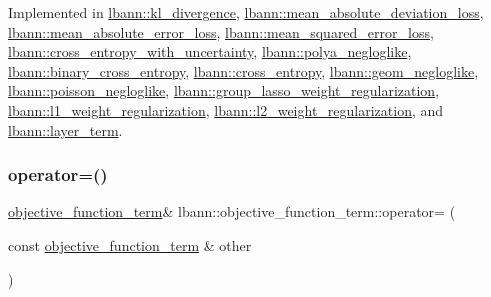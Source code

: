 Implemented in \hyperlink{classlbann_1_1kl__divergence_a42f016a75f640cb4ec9ceb9320da4a47}{lbann\+::kl\+\_\+divergence}, \hyperlink{classlbann_1_1mean__absolute__deviation__loss_a05e9ac150bf3875ebb0a81e07ac3dfa0}{lbann\+::mean\+\_\+absolute\+\_\+deviation\+\_\+loss}, \hyperlink{classlbann_1_1mean__absolute__error__loss_ae44350a67a0be0357291827f194d9f77}{lbann\+::mean\+\_\+absolute\+\_\+error\+\_\+loss}, \hyperlink{classlbann_1_1mean__squared__error__loss_ab34d59b168205f198b1d4c299365fbbb}{lbann\+::mean\+\_\+squared\+\_\+error\+\_\+loss}, \hyperlink{classlbann_1_1cross__entropy__with__uncertainty_a56d734c6665ac1752d8ef821edf2f464}{lbann\+::cross\+\_\+entropy\+\_\+with\+\_\+uncertainty}, \hyperlink{classlbann_1_1polya__negloglike_ab787129d7caa79b04b91a9660b31d3b8}{lbann\+::polya\+\_\+negloglike}, \hyperlink{classlbann_1_1binary__cross__entropy_a6a068d51808a54a2a6dd913650f60569}{lbann\+::binary\+\_\+cross\+\_\+entropy}, \hyperlink{classlbann_1_1cross__entropy_a142c9188b0a251ddaf0325e1f310f205}{lbann\+::cross\+\_\+entropy}, \hyperlink{classlbann_1_1geom__negloglike_aabbb379989dba5bc7cb698ebf7bc8861}{lbann\+::geom\+\_\+negloglike}, \hyperlink{classlbann_1_1poisson__negloglike_ae5a73d52075578a3d0ed0b150a980741}{lbann\+::poisson\+\_\+negloglike}, \hyperlink{classlbann_1_1group__lasso__weight__regularization_a1cd895144b2816592ceeecd4d2f7a1d1}{lbann\+::group\+\_\+lasso\+\_\+weight\+\_\+regularization}, \hyperlink{classlbann_1_1l1__weight__regularization_a4a41b6a07c36fc4f82364295a404ba1b}{lbann\+::l1\+\_\+weight\+\_\+regularization}, \hyperlink{classlbann_1_1l2__weight__regularization_acf602d51617f6730343948b72ace8dfe}{lbann\+::l2\+\_\+weight\+\_\+regularization}, and \hyperlink{classlbann_1_1layer__term_a4942422215408e724e68b5df8b20b715}{lbann\+::layer\+\_\+term}.

\mbox{\label{classlbann_1_1objective__function__term_a8bbac194d96a854d5841817b67b63334}} 
\subsubsection{\texorpdfstring{operator=()}{operator=()}}
{\footnotesize\ttfamily \hyperlink{classlbann_1_1objective__function__term}{objective\+\_\+function\+\_\+term}\& lbann\+::objective\+\_\+function\+\_\+term\+::operator= (\begin{DoxyParamCaption}\item[{const \hyperlink{classlbann_1_1objective__function__term}{objective\+\_\+function\+\_\+term} \&}]{other }\end{DoxyParamCaption})\hspace{0.3cm}{\ttfamily [default]}}

